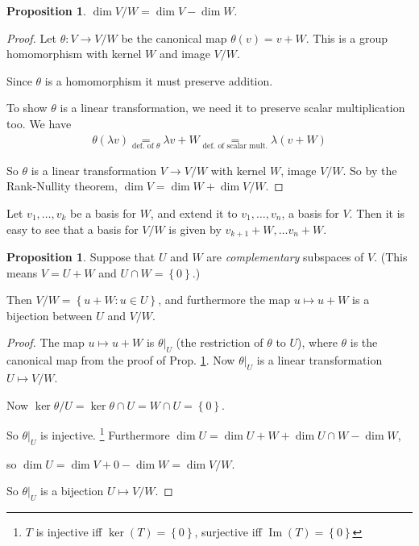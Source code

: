 \documentclass{article}
\theoremstyle{definition} \newtheorem*{definition}{Definition}
\newtheorem{proposition}[theorem]{Proposition}
\DeclareMathOperator{\Ima}{Im} \DeclareMathOperator{\Sym}{Sym}
\begin{document}
\begin{proposition}
  $\dim V/W = \dim V - \dim W$.
  \label{prp:dimvw}
\end{proposition}

\begin{proof}
  Let $\theta:V \rightarrow V/W$ be the canonical map $\theta(v) = v + W$. This is a group
  homomorphism with kernel $W$ and image $V/W$.

  Since $\theta$ is a homomorphism it must preserve addition.

  To show $\theta$ is a linear transformation, we need it to preserve scalar multiplication too. We have 
\begin{align*}
  \theta(\lambda v) \underset{\text{def. of }\theta}{=} \lambda v + W \underset{\text{def. of
  scalar mult.}}{=} \lambda (v + W)
\end{align*}

So $\theta$ is a linear transformation $V \rightarrow V/W$ with kernel $W$, image $V/W$. So by
the Rank-Nullity theorem, $\dim V = \dim W + \dim V/W$.
\end{proof}

\begin{remark}
  Let $v_1, \dots, v_k$ be a basis for $W$, and extend it to $v_1, \dots, v_n$, a basis for $V$.
  Then it is easy to see that a basis for $V/W$ is given by $v_{k+1}+W, \dots
  v_n + W$.\\
\end{remark}

\begin{proposition}
  Suppose that $U$ and $W$ are \emph{complementary} subspaces of $V$.
  (This  means $V = U + W$ and $U \cap W = \left\{ 0 \right\}$.)

  Then $V/W = \left\{ u + W : u \in U \right\}$, and furthermore the map
  $u \mapsto u + W$ is a bijection between $U$ and $V/W$.
\end{proposition}

\begin{proof}
  The map $u \mapsto u + W$ is $\theta|_U$ (the restriction of $\theta$
  to $U$), where $\theta$ is the canonical map from the proof of Prop.
  \ref{prp:dimvw}. Now $\theta|_U$ is a linear transformation 
  $U \mapsto V/W$.

  Now $\ker \theta / U = \ker \theta \cap U = W \cap U = \left\{ 0 \right\}$.

  So $\theta|_U$ is injective.
  \footnote{$T$ is injective iff $\ker(T) = \left\{ 0 \right\}$, surjective
  iff  $\Ima(T) = \left\{ 0 \right\}$}
  Furthermore $\dim U = \dim U + W + 
  \dim U \cap W - \dim W$,

  so $\dim U = \dim V + 0 - \dim W = \dim V / W$. 

  So $\theta|_U$ is a bijection $U \mapsto V/W$.
\end{proof}
\end{document}
